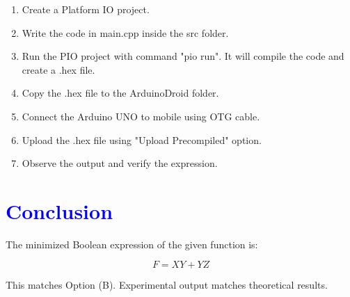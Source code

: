 \documentclass[12pt,a4paper]{article}
\begin{document}
\begin{enumerate}
    \item Create a Platform IO project.
    \item Write the code in main.cpp inside the src folder.
    \item Run the PIO project with command "pio run". It will compile the code and create a .hex file.
    \item Copy the .hex file to the ArduinoDroid folder.
    \item Connect the Arduino UNO to mobile using OTG cable.
    \item Upload the .hex file using "Upload Precompiled" option.
    \item Observe the output and verify the expression.
\end{enumerate}

\section*{\textcolor{blue}{Conclusion}}

The minimized Boolean expression of the given function is:

\[
F = XY + YZ
\]

This matches Option (B).  
Experimental output matches theoretical results.
\end{document}
